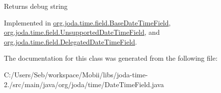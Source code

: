\begin{DoxyReturn}{Returns}
debug string 
\end{DoxyReturn}


Implemented in \hyperlink{classorg_1_1joda_1_1time_1_1field_1_1_base_date_time_field_a31a07fddd0b9a57b5928d58a8cb991fa}{org.\-joda.\-time.\-field.\-Base\-Date\-Time\-Field}, \hyperlink{classorg_1_1joda_1_1time_1_1field_1_1_unsupported_date_time_field_ac3e09fac27231e85a250e94c97985af6}{org.\-joda.\-time.\-field.\-Unsupported\-Date\-Time\-Field}, and \hyperlink{classorg_1_1joda_1_1time_1_1field_1_1_delegated_date_time_field_ad7122173991dffa9cdd9a5421d7b1e64}{org.\-joda.\-time.\-field.\-Delegated\-Date\-Time\-Field}.



The documentation for this class was generated from the following file\-:\begin{DoxyCompactItemize}
\item 
C\-:/\-Users/\-Seb/workspace/\-Mobii/libs/joda-\/time-\/2./src/main/java/org/joda/time/Date\-Time\-Field.\-java\end{DoxyCompactItemize}
